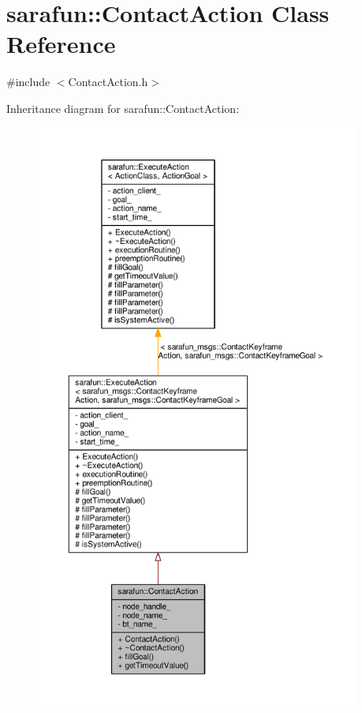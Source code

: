 \hypertarget{classsarafun_1_1ContactAction}{\section{sarafun\-:\-:Contact\-Action Class Reference}
\label{classsarafun_1_1ContactAction}
}


{\ttfamily \#include $<$Contact\-Action.\-h$>$}



Inheritance diagram for sarafun\-:\-:Contact\-Action\-:
\nopagebreak
\begin{figure}[H]
\begin{center}
\leavevmode
\includegraphics[height=550pt]{d8/d33/classsarafun_1_1ContactAction__inherit__graph}
\end{center}
\end{figure}


